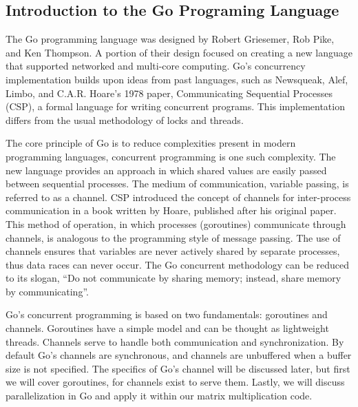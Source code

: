 \goColor
\subsection{Introduction to the Go Programing Language}
	The Go programming language was designed by Robert Griesemer, Rob Pike, and Ken Thompson. A portion of their design focused on creating a new language that supported networked and multi-core computing. Go’s concurrency implementation builds upon ideas from past languages, such as Newsqueak, Alef, Limbo, and C.A.R. Hoare’s 1978 paper, Communicating Sequential Processes (CSP), a formal language for writing concurrent programs. \cite{prell:hal-00718924} This implementation differs from the usual methodology of locks and threads.
	
	The core principle of Go is to reduce complexities present in modern programming languages, concurrent programming is one such complexity. The new language provides an approach in which shared values are easily passed between sequential processes. The medium of communication, variable passing, is referred to as a channel. CSP introduced the concept of channels for inter-process communication in a book written by Hoare, published after his original paper. This method of operation, in which processes (goroutines) communicate through channels, is analogous to the programming style of message passing. The use of channels ensures that variables are never actively shared by separate processes, thus data races can never occur. The Go concurrent methodology can be reduced to its slogan, “Do not communicate by sharing memory; instead, share memory by communicating”. \cite{website:go-lang-documentation}
	
	Go’s concurrent programming is based on two fundamentals: goroutines and channels. Goroutines have a simple model and can be thought as lightweight threads. Channels serve to handle both communication and synchronization. By default Go’s channels are synchronous, and channels are unbuffered when a buffer size is not specified. \cite{prell:hal-00718924} The specifics of Go’s channel will be discussed later, but first we will cover goroutines, for channels exist to serve them. Lastly, we will discuss parallelization in Go and apply it within our matrix multiplication code.
